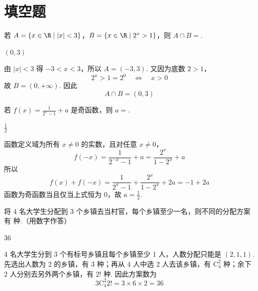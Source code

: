 \section{填空题}

\begin{problem}
若 \(A = \{x \in \R \mid |x| < 3\}\)，\(B = \{x \in \R \mid 2^{x} > 1\}\)，则 \(A \cap B =\)\fillinblank{}.

\begin{answer}
\((0,3)\)
\end{answer}

\begin{solution}
由 \(|x|<3\) 得 \(-3<x<3\)，所以 \(A=(-3,3)\). 又因为底数 \(2>1\)，
\[
2^x>1=2^0\quad\Longleftrightarrow\quad x>0
\]
故 \(B=(0,+\infty)\). 因此
\[
A\cap B=(0,3)
\]
\end{solution}
\end{problem}

\begin{problem}
若 \(f(x) = \frac{1}{2^{x} - 1} + a\) 是奇函数，则 \(a =\)\fillinblank{}.

\begin{answer}
\(\frac{1}{2}\)
\end{answer}

\begin{solution}
函数定义域为所有 \(x\ne0\) 的实数，且对任意 \(x\ne0\)，
\[
f(-x)=\frac{1}{2^{-x}-1}+a
=\frac{2^x}{1-2^x}+a
\]
所以
\[
f(x)+f(-x)
=\frac{1}{2^x-1}+\frac{2^x}{1-2^x}+2a
=-1+2a
\]
函数为奇函数当且仅当上式恒为 0，故 \(a=\frac{1}{2}\).
\end{solution}
\end{problem}

\begin{problem}
将 4 名大学生分配到 3 个乡镇去当村官，每个乡镇至少一名，则不同的分配方案有\fillinblank{} 种.（用数字作答）

\begin{answer}
36
\end{answer}

\begin{solution}
4 名大学生分到 3 个有标号乡镇且每个乡镇至少 1 人，人数分配只能是 \((2,1,1)\). 先选出人数为 2 的乡镇，有 3 种；再从 4 人中选 2 人去该乡镇，有 \(\mathrm C_{4}^{2}\) 种；余下 2 人分别去另外两个乡镇，有 \(2!\) 种. 因此方案数为
\[
3\mathrm C_{4}^{2}2!=3\times6\times2=36
\]
\end{solution}
\end{problem}

